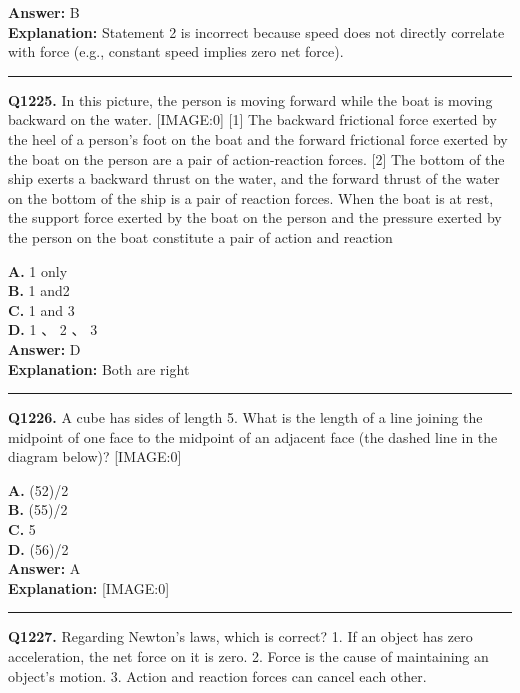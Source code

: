 \documentclass[12pt]{article}
\begin{document}
\textbf{Answer:} B \\
\textbf{Explanation:} Statement 2 is incorrect because speed does not directly correlate with force (e.g., constant speed implies zero net force).

\hrule
\vspace{1em}


\noindent
\textbf{Q1225.} In this picture, the person is moving forward while the boat is moving backward on the water.
[IMAGE:0]
[1]
The backward frictional force exerted by the heel of a person's foot on the boat and the forward frictional force exerted by the boat on the person are a pair of action-reaction forces.
[2]
The bottom of the ship exerts a backward thrust on the water, and the forward thrust of the water on the bottom of the ship is a pair of reaction forces.
When the boat is at rest, the support force exerted by the boat on the person and the pressure exerted by the person on the boat constitute a pair of action and reaction



\textbf{A.} 1 only \\
\textbf{B.} 1 and2 \\
\textbf{C.} 1 and 3 \\
\textbf{D.} 1
、
2
、
3 \\

\textbf{Answer:} D \\
\textbf{Explanation:} Both are right

\hrule
\vspace{1em}


\noindent
\textbf{Q1226.} A cube has sides of length 5. What is the length of a line joining the midpoint of one face to the midpoint of an adjacent face (the dashed line in the diagram below)?
[IMAGE:0]



\textbf{A.} (5\sqrt{}2)/2 \\
\textbf{B.} (5\sqrt{}5)/2 \\
\textbf{C.} 5 \\
\textbf{D.} (5\sqrt{}6)/2 \\

\textbf{Answer:} A \\
\textbf{Explanation:} [IMAGE:0]

\hrule
\vspace{1em}


\noindent
\textbf{Q1227.} Regarding Newton’s laws, which is correct?
1.
If an object has zero acceleration, the net force on it is zero.
2.
Force is the cause of maintaining an object’s motion.
3.
Action and reaction forces can cancel each other.
\end{document}
